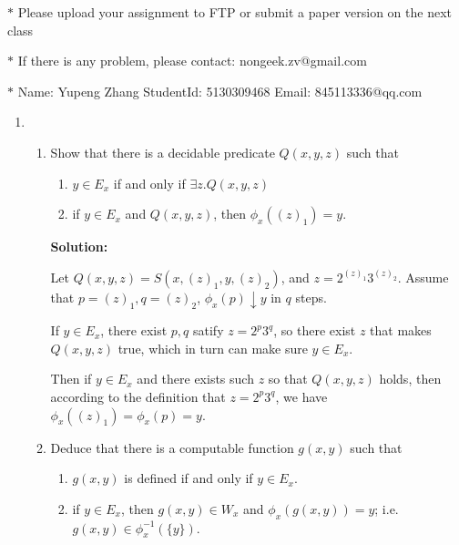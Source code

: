 \documentclass[12pt,a4paper]{article}
\theoremstyle{definition}
\numberwithin{equation}{section}
\numberwithin{figure}{section}
\begin{document}
\noindent{}
\begin{center}
\footnotesize{\color{red}$*$ Please upload your assignment to FTP or submit a paper version on the next class}

\footnotesize{\color{red}$*$ If there is any problem, please contact: nongeek.zv@gmail.com }

\footnotesize{\color{blue}$*$ Name: Yupeng Zhang \quad StudentId:  5130309468 \quad Email: 845113336@qq.com}
\end{center}


\begin{enumerate}%

\item
\begin{enumerate}
\item Show that there is a decidable predicate $Q(x,y,z)$ such that
\begin{enumerate}
\item $y\in E_x$ if and only if $\exists z.Q(x,y,z)$
\item if $y\in E_x$ and $Q(x,y,z)$, then $\phi_x((z)_1)=y$.
\end{enumerate}

\textbf{Solution:}

Let $Q(x,y,z) =S(x,(z)_1,y,(z)_2)$, and $z=2^{(z)_1}3^{(z)_2}$. Assume that $p =(z)_1,q=(z)_2$, $\phi_x(p) \downarrow y$ in $q$ steps. 

If $y \in E_x$, there exist $p,q$ satify $z=2^p3^q$, so there exist $z$ that makes $Q(x,y,z)$ true, which in turn can make sure $y \in E_x$.

Then if $y \in E_x$ and there exists such $z$ so that $Q(x, y, z)$ holds, then according to the definition that $z = 2^p3^q$, we have $\phi_x((z)_1) = \phi_x(p) = y$. 

\item Deduce that there is a computable function $g(x,y)$ such that
\begin{enumerate}
\item $g(x,y)$ is defined if and only if $y\in E_x$.
\item if $y\in E_x$, then $g(x,y)\in W_x$ and $\phi_x(g(x,y))=y$; i.e. $g(x,y)\in \phi^{-1}_x(\{y\})$.
\end{enumerate}


\end{enumerate}
\end{enumerate}
\end{document}
